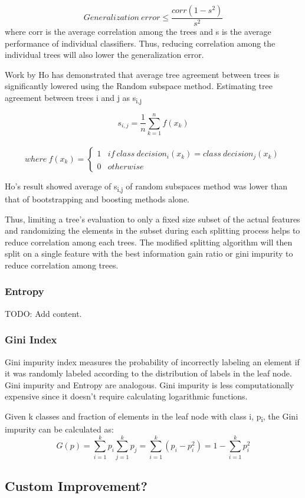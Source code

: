 \documentclass{article} %
\begin{document}
\[Generalization\ error \leq \frac{corr(1-s^2)}{s^2}\] where corr is the average correlation among the trees and s is the average performance of individual classifiers. Thus, reducing correlation among the individual trees will also lower the generalization error.

 Work by Ho has demonstrated that average tree agreement between trees is significantly lowered using the Random subspace method. \cite{Ho98}
Estimating tree agreement between trees i and j as s\textsubscript{i,j}

\[ s_{i,j} = \frac{1}{n}\sum_{k=1}^{n}f(x_k)\]
\
\[ where \ f(x_k) = \begin{cases} 
      1 & if\ class\ decision_i(x_k) = class \ decision_j(x_k) \\
      0 & otherwise
   \end{cases}
\]

Ho's result showed average of s\textsubscript{i,j} of random subspaces method was lower than that of bootstrapping and boosting methods alone. \cite{Ho98}

 Thus, limiting a tree's evaluation to only a fixed size subset of the actual features and randomizing the elements in the subset during each splitting process helps to reduce correlation among each trees. The modified splitting algorithm will then split on a single feature with the best information gain ratio or gini impurity to reduce correlation among trees.

\subsubsection{Entropy}
TODO: Add content.

\subsubsection{Gini Index}
Gini impurity index measures the probability of incorrectly labeling an element if it was randomly labeled according to the distribution of labels in the leaf node. Gini impurity and Entropy are analogous. Gini impurity is less computationally expensive since it doesn't require calculating logarithmic functions.

Given k classes and fraction of elements in the leaf node with class i, p\textsubscript{i}, the Gini impurity can be calculated as:
\[G(p) = \sum_{i=1}^{k}p_i \sum_{j=1}^{k}p_j = \sum_{i=1}^{k}(p_i-p_i^2) = 1 - \sum_{i=1}^{k}p_i^2 \]

\subsection{Custom Improvement?}
\end{document}
